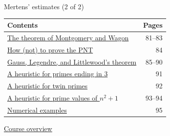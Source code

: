 \documentclass[aspectratio=169,11pt]{beamer}
\begin{document}
\begin{frame}{Mertens' estimates (2 of 2)}
\small\renewcommand{\arraystretch}{1.35}
\begin{tabular}{p{}r}\textbf{Contents}&\textbf{Pages}\\\midrule
\hyperlink{Navigation81}{The theorem of Montgomery and Wagon}&81--83\\
\hyperlink{Navigation84}{How (not) to prove the PNT}&84\\
\hyperlink{Navigation85}{Gauss, Legendre, and Littlewood's theorem}&85--90\\
\hyperlink{Navigation91}{A heuristic for primes ending in 3}&91\\
\hyperlink{Navigation92}{A heuristic for twin primes}&92\\
\hyperlink{Navigation93}{A heuristic for prime values of $n^2+1$}&93--94\\
\hyperlink{Navigation95}{Numerical examples}&95\\
\end{tabular}\par\medskip\hyperlink{overview}{\color{teal}Course overview}\end{frame}
\end{document}
